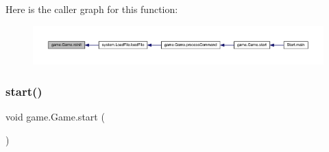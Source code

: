 Here is the caller graph for this function\+:
\nopagebreak
\begin{figure}[H]
\begin{center}
\leavevmode
\includegraphics[width=350pt]{classgame_1_1_game_a901ff06a39733ad5f8cf080f5833e252_icgraph}
\end{center}
\end{figure}
\mbox{\label{classgame_1_1_game_aaf75940b0f76230037ff41f72b73909d}} 
\subsubsection{\texorpdfstring{start()}{start()}}
{\footnotesize\ttfamily void game.\+Game.\+start (\begin{DoxyParamCaption}{ }\end{DoxyParamCaption})\hspace{0.3cm}{\ttfamily [inline]}}

